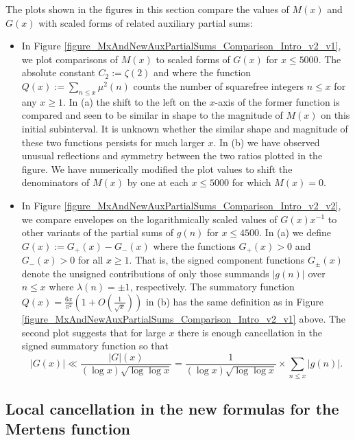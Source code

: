 \documentclass[11pt,reqno,a4letter]{article}
\newcommand{\hlocalref}[1]{\hyperref[#1]{\ref{#1}}}
\numberwithin{equation}{section}
\numberwithin{figure}{section}
\numberwithin{table}{section}
\theoremstyle{plain}
\numberwithin{theorem}{section}
\theoremstyle{definition}
\begin{document}
The plots shown in the figures in this section compare 
the values of $M(x)$ and $G(x)$ with scaled forms of related auxiliary partial sums: 
\begin{itemize}[noitemsep,topsep=0pt,leftmargin=0.23in]

\item In Figure \hlocalref{figure_MxAndNewAuxPartialSums_Comparison_Intro_v2_v1}, 
      we plot comparisons of $M(x)$ to scaled forms of $G(x)$ for $x \leq 5000$. The 
      absolute constant $C_2 := \zeta(2)$ and where the function 
      $Q(x) := \sum_{n \leq x} \mu^2(n)$ counts the number of squarefree integers $n \leq x$ for any 
      $x \geq 1$. In (a) the shift to the left on the $x$-axis of the former function 
      is compared and seen to be similar in shape to the magnitude of $M(x)$ on this initial subinterval. 
      It is unknown whether the similar shape and magnitude of these two functions persists for 
      much larger $x$. 
      In (b) we have observed unusual reflections and symmetry between the two ratios plotted in the 
      figure. We have numerically modified the plot values to shift the denominators of 
      $M(x)$ by one at each $x \leq 5000$ for which $M(x) = 0$. 

\item In Figure \hlocalref{figure_MxAndNewAuxPartialSums_Comparison_Intro_v2_v2}, we compare 
      envelopes on the logarithmically scaled values of $G(x) x^{-1}$ to other variants of 
      the partial sums of $g(n)$ for $x \leq 4500$. 
      In (a) we define $G(x) := G_{+}(x) - G_{-}(x)$ where the functions 
      $G_{+}(x) > 0$ and $G_{-}(x) > 0$ for all $x \geq 1$. 
      That is, the signed component functions $G_{\pm}(x)$ 
      denote the unsigned contributions of only those summands 
      $|g(n)|$ over $n \leq x$ where $\lambda(n) = \pm 1$, respectively. 
      The summatory function $Q(x) = \frac{6x}{\pi^2}\left(1+O\left(\frac{1}{\sqrt{x}}\right)\right)$ 
      in (b) has the same definition as in 
      Figure \hlocalref{figure_MxAndNewAuxPartialSums_Comparison_Intro_v2_v1} above. 
      The second plot suggests that for large $x$ there is enough cancellation in the 
      signed summatory function so that 
      \[
      |G(x)| \ll \frac{|G|(x)}{(\log x) \sqrt{\log\log x}} = 
           \frac{1}{(\log x) \sqrt{\log\log x}} \times \sum_{n \leq x} |g(n)|.
      \]

\end{itemize}

\subsection{Local cancellation in 
	    the new formulas for the Mertens function} 
\label{subSection_LocalCancellationOfGInvx} 
\end{document}
